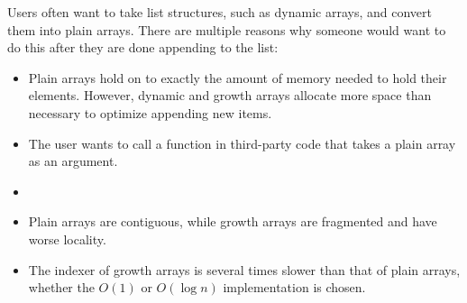 Users often want to take list structures, such as dynamic arrays, and convert them into plain arrays. There are multiple reasons why someone would want to do this after they are done appending to the list:

\begin{itemize}
	\item Plain arrays hold on to exactly the amount of memory needed to hold their elements. However, dynamic and growth arrays allocate more space than necessary to optimize appending new items.
	\item The user wants to call a function in third-party code that takes a plain array as an argument.
	\item
	\item Plain arrays are contiguous, while growth arrays are fragmented and have worse locality.
	\item The indexer of growth arrays is several times slower than that of plain arrays, whether the $O(1)$ or $O(\log n)$ implementation is chosen.
\end{itemize}